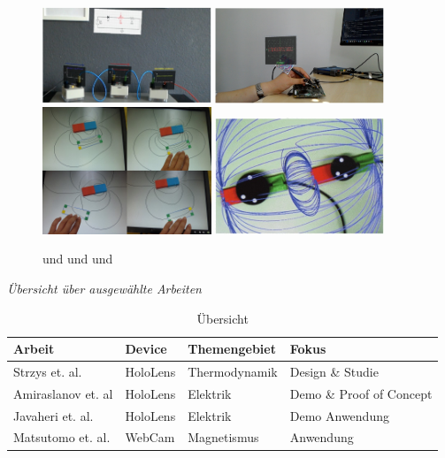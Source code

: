 \begin{figure}[h!]
	\centering
	\includegraphics[width=0.45\textwidth]{images/Amiraslanov18.png}
	\hspace{0.05cm}
	\includegraphics[width=0.45\textwidth]{images/Javaheri18.png}
	\vspace{0.05cm}
	\includegraphics[width=0.45\textwidth]{images/Matsutomo13.jpg}
	\hspace{0.05cm}
	\includegraphics[width=0.45\textwidth]{images/Mannuss11.jpg}
	\caption{\cite{Amiraslanov18} und \cite{Javaheri18} und \cite{Matsutomo13} und \cite{Mannuss11}}
	\label{img:paper-collection}
\end{figure}

\vspace{4px}
\textit{Übersicht über ausgewählte Arbeiten}\\
\setlength\extrarowheight{2pt}
\begin{table}[htb]
	\centering
	\begin{tabular}{l|l|l|l}
		Arbeit & Device & Themengebiet & Fokus\\
		\hline
		\hline
		Strzys et. al. & HoloLens & Thermodynamik & Design \& Studie\\
		\hline
		Amiraslanov et. al & HoloLens & Elektrik & Demo \& Proof of Concept\\
		\hline
		Javaheri et. al. & HoloLens & Elektrik & Demo Anwendung\\
		\hline
		Matsutomo et. al. & WebCam & Magnetismus & Anwendung\\
	\end{tabular}\caption{\label{tab:comparioson} Übersicht}
\end{table}


\nocite{Lebeck16}